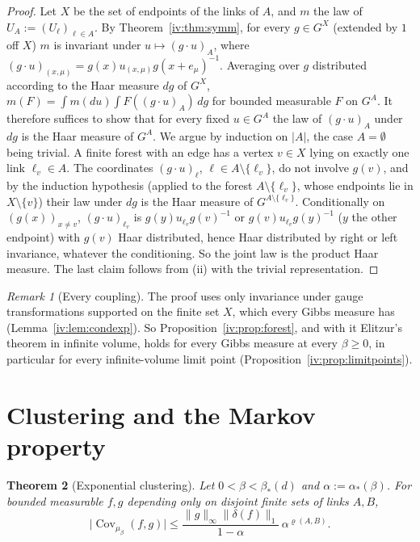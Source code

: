 \documentclass[11pt,a4paper]{article}
\newtheorem{theorem}{Theorem}[section]
\theoremstyle{definition}
\theoremstyle{remark}
\newtheorem{remark}[theorem]{Remark}
\DeclareMathOperator{\Cov}{Cov}
\newcommand{\norm}[1]{\lVert #1\rVert}
\newcommand{\Fref}[3]{\cite[#1~`#2' (\texttt{#3})]{F}}
\newcommand{\aS}{\alpha_*}
\newcommand{\bS}{\beta_*}
\begin{document}
\begin{proof}
Let $X$ be the set of endpoints of the links of $A$, and $m$ the law of $U_A:=(U_\ell)_{\ell\in A}$. By
Theorem~\ref{iv:thm:symm}, for every $g\in G^X$ (extended by $1$ off $X$) $m$ is invariant under $u\mapsto(g\cdot u)_A$, where
$(g\cdot u)_{(x,\mu)}=g(x)u_{(x,\mu)}g(x+e_\mu)^{-1}$. Averaging over $g$ distributed according to the Haar measure $dg$ of
$G^X$, $m(F)=\int m(du)\int F((g\cdot u)_A)\,dg$ for bounded measurable $F$ on $G^A$. It therefore suffices to show that for every
fixed $u\in G^A$ the law of $(g\cdot u)_A$ under $dg$ is the Haar measure of $G^A$. We argue by induction on $|A|$, the case
$A=\emptyset$ being trivial. A finite forest with an edge has a vertex $v\in X$ lying on exactly one link $\ell_v\in A$. The
coordinates $(g\cdot u)_\ell$, $\ell\in A\setminus\{\ell_v\}$, do not involve $g(v)$, and by the induction hypothesis (applied to the
forest $A\setminus\{\ell_v\}$, whose endpoints lie in $X\setminus\{v\}$) their law under $dg$ is the Haar measure of
$G^{A\setminus\{\ell_v\}}$. Conditionally on $(g(x))_{x\neq v}$, $(g\cdot u)_{\ell_v}$ is $g(y)u_{\ell_v}g(v)^{-1}$ or
$g(v)u_{\ell_v}g(y)^{-1}$ ($y$ the other endpoint) with $g(v)$ Haar distributed, hence Haar distributed by right or left
invariance, whatever the conditioning. So the joint law is the product Haar measure. The last claim follows from
\Fref{Cited Theorem}{Haar measure, Peter--Weyl}{thm:pw}(ii) with the trivial representation.
\end{proof}

\begin{remark}[Every coupling]
The proof uses only invariance under gauge transformations supported on the finite set $X$, which every Gibbs measure has
(Lemma~\ref{iv:lem:condexp}). So Proposition~\ref{iv:prop:forest}, and with it Elitzur's theorem in infinite volume, holds for every
Gibbs measure at every $\beta\ge0$, in particular for every infinite-volume limit point (Proposition~\ref{iv:prop:limitpoints}).
\end{remark}

\section{Clustering and the Markov property}\label{iv:sec:markov}

\begin{theorem}[Exponential clustering]\label{iv:thm:cluster}
Let $0<\beta<\bS(d)$ and $\alpha:=\aS(\beta)$. For bounded measurable $f,g$ depending only on disjoint finite sets of links
$A,B$,
\[
\bigl|\Cov_{\mu_\beta}(f,g)\bigr|\le\frac{\norm g_\infty\norm{\delta(f)}_1}{1-\alpha}\,\alpha^{\varrho(A,B)} .
\]
\end{theorem}
\end{document}
